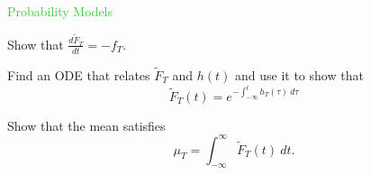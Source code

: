 
%
%
%
%

\begin{slide}
\question

\begin{slidesonly}
	\vspace{3cm}
\end{slidesonly}

\begin{center}
\Huge 
\textcolor{LimeGreen}{Probability Models}
\end{center}

	
\end{slide}



\begin{slide}
\question



\end{slide}

\begin{slide}


\begin{parts}
	\item Show that $\frac{d\tilde{F}_T}{dt} = - f_T$. 
	\item Find an ODE that relates $\tilde{F}_T$ and $h(t)$ and use it to show that
	\[ \tilde{F}_T(t) = e^{-\int_{-\infty}^t h_T(\tau) ~d\tau} \]

	\item Show that the mean satisfies 
	\[\displaystyle 
		\mu_T = \int_{-\infty}^\infty \tilde{F}_T(t) ~dt.
	\]
\end{parts}
	
\end{slide}


